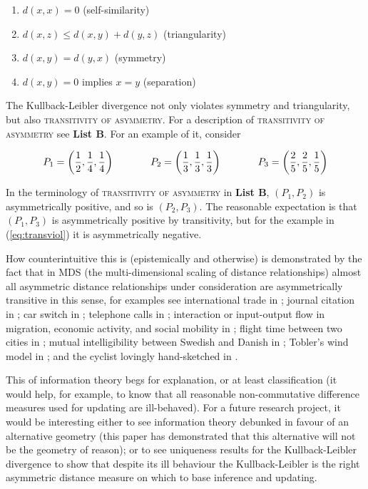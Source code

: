 \documentclass[smallextended]{svjour3}       %
\begin{document}
\begin{enumerate}[(m1)]
\item $d(x,x)=0$ (self-similarity)
\item $d(x,z)\leq{}d(x,y)+d(y,z)$ (triangularity)
\item $d(x,y)=d(y,x)$ (symmetry)
\item $d(x,y)=0$ implies $x=y$ (separation)
\end{enumerate}

The Kullback-Leibler divergence not only violates symmetry and
triangularity, but also \textsc{transitivity of asymmetry}. For a
description of \textsc{transitivity of asymmetry} see \textbf{List B}.
For an example of it, consider

\begin{equation}
  \label{eq:transviol}
    P_{1}=\left(\frac{1}{2},\frac{1}{4},\frac{1}{4}\right)  \hspace{.5in}
    P_{2}=\left(\frac{1}{3},\frac{1}{3},\frac{1}{3}\right) \hspace{.5in}
    P_{3}=\left(\frac{2}{5},\frac{2}{5},\frac{1}{5}\right)
\end{equation}

In the terminology of \textsc{transitivity of asymmetry} in \textbf{List B},
$(P_{1},P_{2})$ is asymmetrically positive, and so is $(P_{2},P_{3})$.
The reasonable expectation is that $(P_{1},P_{3})$ is asymmetrically
positive by transitivity, but for the example in (\ref{eq:transviol})
it is asymmetrically negative.

How counterintuitive this is (epistemically and otherwise) is
demonstrated by the fact that in MDS (the multi-dimensional scaling of
distance relationships) almost all asymmetric distance relationships
under consideration are asymmetrically transitive in this sense, for
examples see international trade in ; journal
citation in ; car switch in
; telephone calls in
; interaction or input-output flow in
migration, economic activity, and social mobility in
; flight time between two cities in
; mutual intelligibility between Swedish
and Danish in ; Tobler's wind model in
; and the cyclist lovingly hand-sketched in
.

This  of information theory begs for explanation,
or at least classification (it would help, for example, to know that
all reasonable non-commutative difference measures used for updating
are ill-behaved). For a future research project, it would be
interesting either to see information theory debunked in favour of an
alternative geometry (this paper has demonstrated that this
alternative will not be the geometry of reason); or to see uniqueness
results for the Kullback-Leibler divergence to show that despite its
ill behaviour the Kullback-Leibler is the right asymmetric distance
measure on which to base inference and updating.
\end{document}
